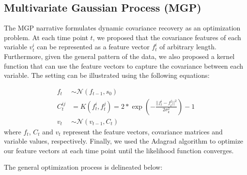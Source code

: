 \documentclass[12pt]{article}
\begin{document}
\subsection{Multivariate Gaussian Process (MGP)}
The MGP narrative formulates dynamic covariance recovery as an optimization problem. At each time point $t$, we proposed that the covariance features of each variable $v^i_t$ can be represented as a feature vector $f^i_t$ of arbitrary length. Furthermore, given the general pattern of the data, we also proposed a kernel function that can use the feature vectors to capture the covariance between each variable. The setting can be illustrated using the following equations: \par
\begin{align*}
f_t &\sim \mathcal{N}(f_{t-1},s_0)\\
C^{ij}_t&=K(f_t^i,f_t^j)=2* \exp(-\frac{||f_t^i-f_t^j||^2}{2\sigma_k^2})-1\\
v_t &\sim \mathcal{N} (v_{t-1},C_t)
\end{align*}
where $f_t$, $C_t$ and $v_t$ represent the feature vectors, covariance matrices and variable values, respectively. Finally, we used the Adagrad algorithm to optimize our feature vectors at each time point until the likelihood function converges. \par
The general optimization process is delineated below:
\end{document}
